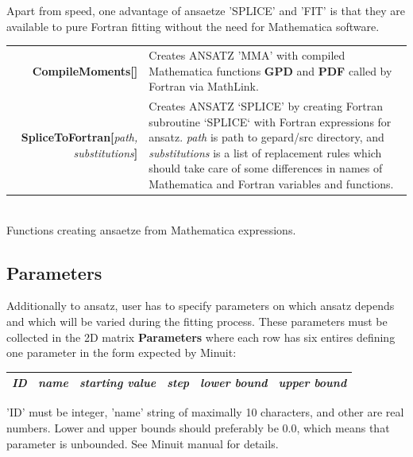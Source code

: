 \documentclass[12pt]{article}
\newcommand{\defboxitem}[3]{ {\ttfamily \bfseries #1[}\emph{#2}{\ttfamily \bfseries ]} & #3 }
\newcommand{\mmacomm}[1]{ {\ttfamily \bfseries #1} }
\begin{document}
Apart from speed, one advantage of ansaetze 'SPLICE' and 'FIT' is that they are
available to pure Fortran fitting without the need for Mathematica software.

\begin{flushleft}
\colorbox{defbox}{%
\begin{minipage}{\textwidth}%
\begin{tabular}{rp{8cm}}%
\defboxitem{CompileMoments}{}{Creates ANSATZ 'MMA' with compiled Mathematica 
functions \mmacomm{GPD} and \mmacomm{PDF} called by Fortran via MathLink.} \\[0.8ex]
\defboxitem{SpliceToFortran}{path, substitutions}{Creates ANSATZ `SPLICE' by
creating  Fortran subroutine `SPLICE` with Fortran expressions for ansatz.
\emph{path} is path to gepard/src directory, and 
\emph{substitutions} is a list of replacement rules which should take care of some 
differences in names of Mathematica and Fortran variables and functions.} 
\end{tabular}%
\end{minipage}}\\[0.5ex]
{\small Functions creating ansaetze from Mathematica expressions.}
\end{flushleft}

\subsection{Parameters}

Additionally to ansatz, user has to specify parameters on which ansatz depends and
which will be varied during the fitting process. These parameters must be collected
in the 2D matrix \mmacomm{Parameters} where each row has six entires defining one 
parameter in the form expected by Minuit:

\vspace*{2ex}

\begin{tabular}[h]{|c|c|c|c|c|c|}
\hline
\emph{ID} & \emph{name} & \emph{starting value} & \emph{step} & \emph{lower bound} & 
\emph{upper bound} \\
\hline
\end{tabular}

\vspace*{2ex}

'ID' must be integer, 'name' string of maximally 10 characters, and other are real numbers.
Lower and upper bounds should preferably be 0.0, which means that parameter is unbounded.
See Minuit manual for details.
\end{document}
